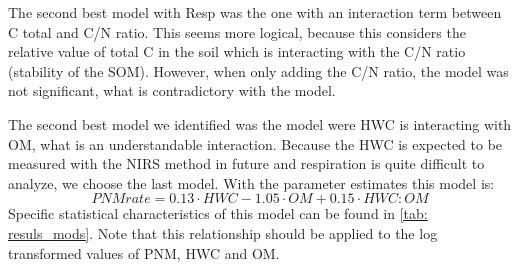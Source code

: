 \documentclass[10pt,twoside,dutch,english]{report}
\begin{document}
 The second best model with Resp was the one with an interaction term between C total and C/N ratio. This seems more logical, because this considers the relative value of total C in the soil which is interacting with the C/N ratio (stability of the SOM). However, when only adding the C/N ratio, the model was not significant, what is contradictory with the model. 
 
 The second best model we identified was the model were HWC is interacting with OM, what is an understandable interaction.  Because the HWC is expected to be measured with the NIRS method in future \citep{Vasques2009} and respiration is quite difficult to analyze, we choose the last model. With the parameter estimates this model is: 
\begin{equation} %
PNM rate = 0.13\cdot HWC -1.05\cdot OM +0.15\cdot HWC:OM
\label{eq: model}
\end{equation}
Specific statistical characteristics of this model can be found in \ref{tab: resuls_mods}. Note that this relationship should be applied to the log transformed values of PNM, HWC and OM. 
\end{document}
